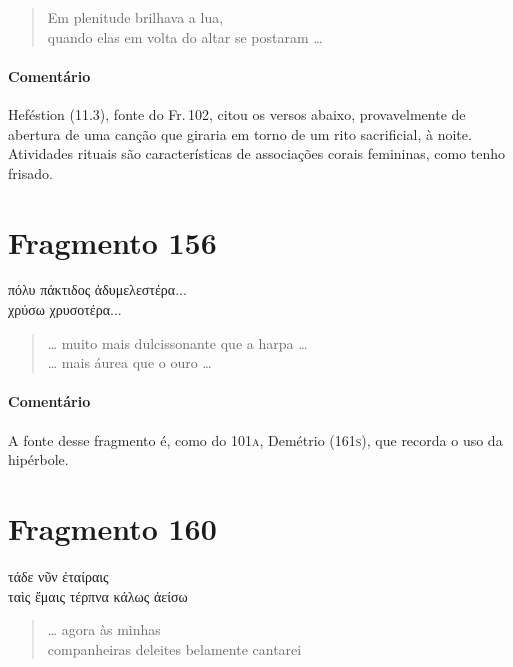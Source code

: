 \begin{verse}
Em plenitude brilhava a lua,\\
quando elas em volta do altar se postaram \ldots{}
\end{verse}

\medskip

{\paragraph{Comentário} Heféstion (11.3), fonte do Fr.\,102, citou os versos abaixo, provavelmente de abertura
de uma canção que giraria em torno de um rito sacrificial, à noite. Atividades rituais são características de associações corais femininas, como tenho frisado.}


\section{Fragmento 156}

\begin{gkverse}
πόλυ πάκτιδος ἀδυμελεστέρα...\\
χρύσω χρυσοτέρα...
\end{gkverse}

\begin{verse}
\ldots{} muito mais dulcissonante que a harpa \ldots{}\\
\ldots{} mais áurea que o ouro \ldots{}
\end{verse}

\medskip

{\paragraph{Comentário} A fonte desse fragmento é, como do 101\textsc{a}, Demétrio (161\textsc{s}), que recorda o uso da
hipérbole.}

\section{Fragmento 160}

\begin{gkverse}
τάδε νῦν ἐταίραις\\
ταὶς ἔμαις \dagger{}τέρπνα\dagger{} κάλως ἀείσω
\end{gkverse}

\begin{verse}
\ldots{} agora às minhas\\
companheiras deleites belamente cantarei
\end{verse}

